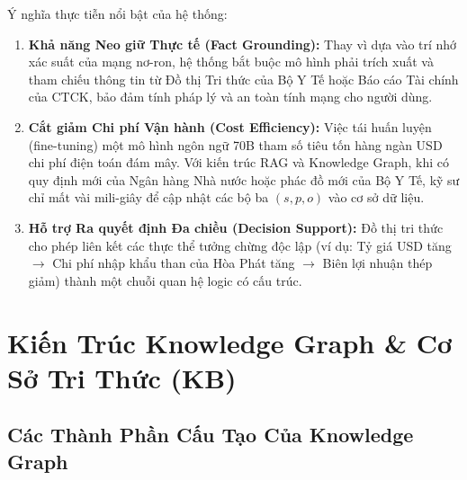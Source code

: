 \documentclass[12pt,a4paper]{report}
\begin{document}
Ý nghĩa thực tiễn nổi bật của hệ thống:
\begin{enumerate}
    \item \textbf{Khả năng Neo giữ Thực tế (Fact Grounding):} Thay vì dựa vào trí nhớ xác suất của mạng nơ-ron, hệ thống bắt buộc mô hình phải trích xuất và tham chiếu thông tin từ Đồ thị Tri thức của Bộ Y Tế hoặc Báo cáo Tài chính của CTCK, bảo đảm tính pháp lý và an toàn tính mạng cho người dùng.
    \item \textbf{Cắt giảm Chi phí Vận hành (Cost Efficiency):} Việc tái huấn luyện (fine-tuning) một mô hình ngôn ngữ 70B tham số tiêu tốn hàng ngàn USD chi phí điện toán đám mây. Với kiến trúc RAG và Knowledge Graph, khi có quy định mới của Ngân hàng Nhà nước hoặc phác đồ mới của Bộ Y Tế, kỹ sư chỉ mất vài mili-giây để cập nhật các bộ ba $(s, p, o)$ vào cơ sở dữ liệu.
    \item \textbf{Hỗ trợ Ra quyết định Đa chiều (Decision Support):} Đồ thị tri thức cho phép liên kết các thực thể tưởng chừng độc lập (ví dụ: Tỷ giá USD tăng $\to$ Chi phí nhập khẩu than của Hòa Phát tăng $\to$ Biên lợi nhuận thép giảm) thành một chuỗi quan hệ logic có cấu trúc.
\end{enumerate}

\newpage

\chapter{Kiến Trúc Knowledge Graph \& Cơ Sở Tri Thức (KB)}

\section{Các Thành Phần Cấu Tạo Của Knowledge Graph}
\end{document}
